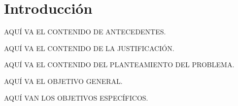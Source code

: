 \chapter*{Introducción}


\label{sect:motivacion}

AQU\'I VA EL CONTENIDO DE ANTECEDENTES. 

\label{sect:justificacion}

AQU\'I VA EL CONTENIDO DE LA JUSTIFICACI\'ON.

\label{sect:planteamiento}

AQU\'I VA EL CONTENIDO DEL PLANTEAMIENTO DEL PROBLEMA.

\label{sect:objetivo_general}

AQU\'I VA EL OBJETIVO GENERAL.

\label{sect:objetivos_especificos}

AQU\'I VAN LOS OBJETIVOS ESPEC\'IFICOS.
